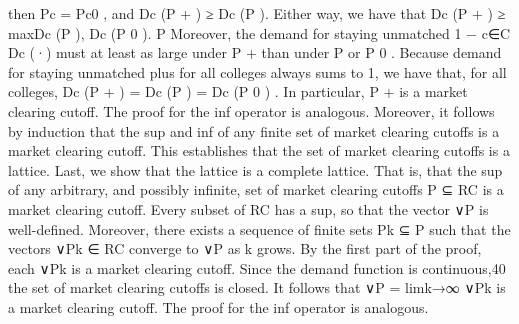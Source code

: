 \documentclass[10pt]{article}
\begin{document}
\begin{ReviewVerbatim}
then Pc = Pc0 , and Dc (P + ) ≥ Dc (P ). Either way, we have that
Dc (P + ) ≥ max{Dc (P ), Dc (P 0 )}.
P
Moreover, the demand for staying unmatched 1 − c∈C Dc (·) must at least as large
under P + than under P or P 0 . Because demand for staying unmatched plus for all
colleges always sums to 1, we have that, for all colleges, Dc (P + ) = Dc (P ) = Dc (P 0 )
. In particular, P + is a market clearing cutoff. The proof for the inf operator is
analogous. Moreover, it follows by induction that the sup and inf of any finite set of
market clearing cutoffs is a market clearing cutoff. This establishes that the set of
market clearing cutoffs is a lattice.
Last, we show that the lattice is a complete lattice. That is, that the sup of any
arbitrary, and possibly infinite, set of market clearing cutoffs P ⊆ RC is a market
clearing cutoff. Every subset of RC has a sup, so that the vector ∨P is well-defined.
Moreover, there exists a sequence of finite sets Pk ⊆ P such that the vectors ∨Pk ∈ RC
converge to ∨P as k grows. By the first part of the proof, each ∨Pk is a market clearing
cutoff. Since the demand function is continuous,40 the set of market clearing cutoffs is
closed. It follows that ∨P = limk→∞ ∨Pk is a market clearing cutoff. The proof for the
inf operator is analogous.
\end{ReviewVerbatim}
\end{document}
